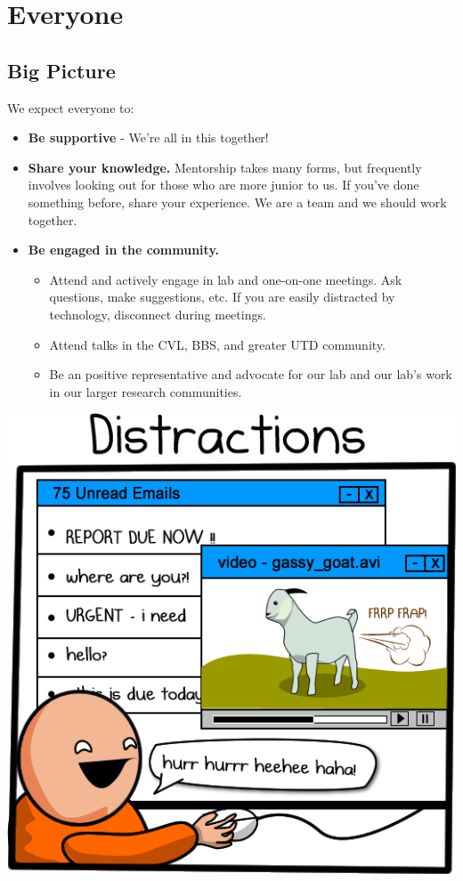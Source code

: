 \documentclass[]{book}
\providecommand{\tightlist}{%
  \setlength{\itemsep}{0pt}\setlength{\parskip}{0pt}}
\begin{document}
\hypertarget{everyone}{%
\section{Everyone}\label{everyone}}

\hypertarget{big-picture}{%
\subsection{Big Picture}\label{big-picture}}

We expect everyone to:

\begin{itemize}
\tightlist
\item
  \textbf{Be supportive} - We're all in this together!\\
\item
  \textbf{Share your knowledge.} Mentorship takes many forms, but frequently involves looking out for those who are more junior to us. If you've done something before, share your experience. We are a team and we should work together.
\item
  \textbf{Be engaged in the community.}

  \begin{itemize}
  \tightlist
  \item
    Attend and actively engage in lab and one-on-one meetings. Ask questions, make suggestions, etc. If you are easily distracted by technology, disconnect during meetings.\\
  \item
    Attend talks in the CVL, BBS, and greater UTD community.\\
  \item
    Be an positive representative and advocate for our lab and our lab's work in our larger research communities.
  \end{itemize}
\end{itemize}

\includegraphics{images/distractions.png}
\end{document}
